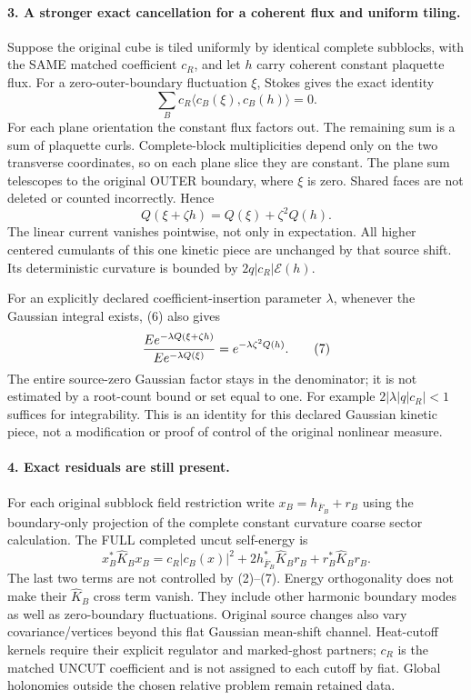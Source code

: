 \documentclass[11pt]{article}
\begin{document}
\paragraph{3. A stronger exact cancellation for a coherent flux and uniform tiling.}
Suppose the original cube is tiled uniformly by identical complete
subblocks, with the SAME matched coefficient $c_R$, and let $h$ carry
coherent constant plaquette flux. For a zero-outer-boundary fluctuation
$\xi$, Stokes gives the exact identity
\[
 \sum_Bc_R\langle c_B(\xi),c_B(h)\rangle=0.                      \tag{5}
\]
For each plane orientation the constant flux factors out. The remaining
sum is a sum of plaquette curls. Complete-block multiplicities depend
only on the two transverse coordinates, so on each plane slice they
are constant. The plane sum telescopes to the original OUTER boundary,
where $\xi$ is zero. Shared faces are not deleted or counted incorrectly.
Hence
\[
 \boxed{Q(\xi+\zeta h)=Q(\xi)+\zeta^2Q(h).}                      \tag{6}
\]
The linear current vanishes pointwise, not only in expectation. All
higher centered cumulants of this one kinetic piece are unchanged by
that source shift. Its deterministic curvature is bounded by
$2q|c_R|\mathcal E(h)$.

For an explicitly declared coefficient-insertion parameter $\lambda$,
whenever the Gaussian integral exists, (6) also gives
\[
 {E e^{-\lambda Q(\xi+\zeta h)}\over E e^{-\lambda Q(\xi)}}
                     =e^{-\lambda\zeta^2Q(h)}.                   \tag{7}
\]
The entire source-zero Gaussian factor stays in the denominator; it is
not estimated by a root-count bound or set equal to one. For example
$2|\lambda|q|c_R|<1$ suffices for integrability. This is an identity for
this declared Gaussian kinetic piece, not a modification or proof of
control of the original nonlinear measure.

\paragraph{4. Exact residuals are still present.}
For each original subblock field restriction write
$x_B=h_{\overline F_B}+r_B$ using the boundary-only projection of the complete constant curvature coarse sector calculation.
The FULL completed uncut self-energy is
\[
 x_B^*\widehat K_Bx_B
 =c_R|c_B(x)|^2+2h_{\overline F_B}^*\widehat K_Br_B
                                      +r_B^*\widehat K_Br_B.      \tag{8}
\]
The last two terms are not controlled by (2)--(7). Energy orthogonality
does not make their $\widehat K_B$ cross term vanish. They include other
harmonic boundary modes as well as zero-boundary fluctuations.
Original source changes also vary covariance/vertices beyond this flat
Gaussian mean-shift channel. Heat-cutoff kernels require their explicit
regulator and marked-ghost partners; $c_R$ is the matched UNCUT coefficient
and is not assigned to each cutoff by fiat. Global holonomies outside
the chosen relative problem remain retained data.
\end{document}
